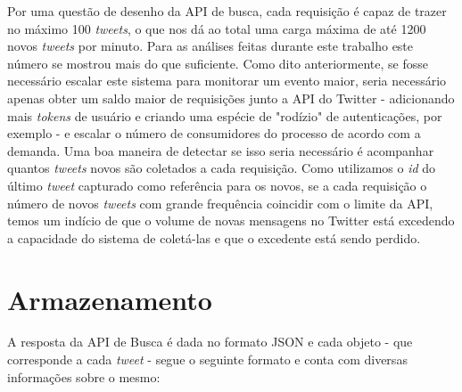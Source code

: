 Por uma questão de desenho da API de busca, cada requisição é capaz de trazer no máximo 100 \textit{tweets}, o que nos dá ao total uma carga máxima de até 1200 novos \textit{tweets} por minuto. Para as análises feitas durante este trabalho este número se mostrou mais do que suficiente. Como dito anteriormente, se fosse necessário escalar este sistema para monitorar um evento maior, seria necessário apenas obter um saldo maior de requisições junto a API do Twitter - adicionando mais \textit{tokens} de usuário e criando uma espécie de "rodízio" de autenticações, por exemplo - e escalar o número de consumidores do processo de acordo com a demanda. Uma boa maneira de detectar se isso seria necessário é acompanhar quantos \textit{tweets} novos são coletados a cada requisição. Como utilizamos o \textit{id} do último \textit{tweet} capturado como referência para os novos, se a cada requisição o número de novos \textit{tweets} com grande frequência coincidir com o limite da API, temos um indício de que o volume de novas mensagens no Twitter está excedendo a capacidade do sistema de coletá-las e que o excedente está sendo perdido.

\section{Armazenamento}
\label{proposta:armazenamento}
A resposta da API de Busca é dada no formato JSON e cada objeto - que corresponde a cada \textit{tweet} - segue o seguinte formato e conta com diversas informações sobre o mesmo: 


